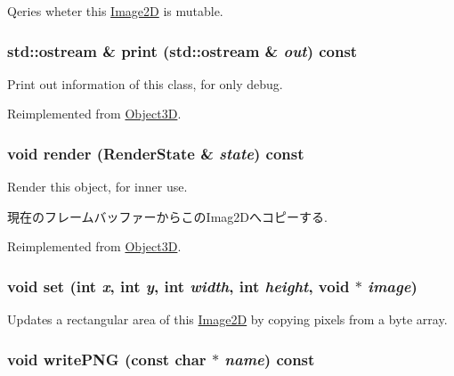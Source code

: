 Qeries wheter this \hyperlink{classm3g_1_1Image2D}{Image2D} is mutable. \hypertarget{classm3g_1_1Image2D_6fea17fa1532df3794f8cb39cb4f911f}{
\subsubsection[{print}]{\setlength{\rightskip}{0pt plus 5cm}std::ostream \& print (std::ostream \& {\em out}) const}}
\label{classm3g_1_1Image2D_6fea17fa1532df3794f8cb39cb4f911f}


Print out information of this class, for only debug. 

Reimplemented from \hyperlink{classm3g_1_1Object3D_6fea17fa1532df3794f8cb39cb4f911f}{Object3D}.\hypertarget{classm3g_1_1Image2D_8babc8a79b78615da51161e94029eea9}{
\subsubsection[{render}]{\setlength{\rightskip}{0pt plus 5cm}void render ({\bf RenderState} \& {\em state}) const}}
\label{classm3g_1_1Image2D_8babc8a79b78615da51161e94029eea9}


Render this object, for inner use.

現在のフレームバッファーからこのImag2Dへコピーする. 

Reimplemented from \hyperlink{classm3g_1_1Object3D_8babc8a79b78615da51161e94029eea9}{Object3D}.\hypertarget{classm3g_1_1Image2D_fe9ef1abefb9e92b38687e27c9004bdc}{
\subsubsection[{set}]{\setlength{\rightskip}{0pt plus 5cm}void set (int {\em x}, \/  int {\em y}, \/  int {\em width}, \/  int {\em height}, \/  void $\ast$ {\em image})}}
\label{classm3g_1_1Image2D_fe9ef1abefb9e92b38687e27c9004bdc}


Updates a rectangular area of this \hyperlink{classm3g_1_1Image2D}{Image2D} by copying pixels from a byte array. \hypertarget{classm3g_1_1Image2D_8957959000d658fd8a3cff474f7ee7e8}{
\subsubsection[{writePNG}]{\setlength{\rightskip}{0pt plus 5cm}void writePNG (const char $\ast$ {\em name}) const}}
\label{classm3g_1_1Image2D_8957959000d658fd8a3cff474f7ee7e8}


